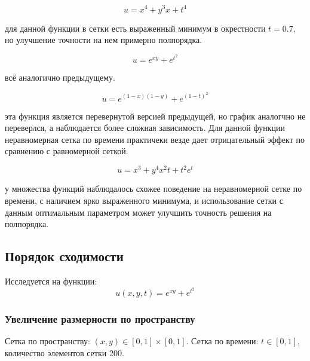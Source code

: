 $$ u = x^4 + y^3x + t^4 $$


\conclusion для данной функции в сетки есть выраженный минимум в окрестности $t=0.7$, но улучшение точности на нем примерно полпорядка.

$$ u = e^{xy} + e^{t^2} $$


\conclusion всё аналогично предыдущему.

$$ u = e^{(1-x)(1-y)} + e^{(1-t)^2} $$


\conclusion эта функция является перевернутой версией предыдущей, но график аналогчно не переверлся, а наблюдается более сложная зависимость. Для данной функции неравномерная сетка по времени практичеки везде дает отрицательный эффект по сравнению с равномерной сеткой.

$$ u = x^3 + y^4 x^2 t + t^2 e^t $$



\conclusion у множества функций наблюдалось схожее поведение на неравномерной сетке по времени, с наличием ярко выраженного минимума, и использование сетки с данным оптимальным параметром может улучшить точность решения на полпорядка.

\subsection{Порядок сходимости}

Исследуется на функции:
$$ u(x, y, t) = e^{xy} + e^{t^2} $$

\subsubsection{Увеличение размерности по пространству}

Сетка по пространству: $ (x, y) \in [0, 1] \times [0, 1] $. Сетка по времени: $ t \in [0, 1] $, количество элементов сетки 200.

\noindent{}

